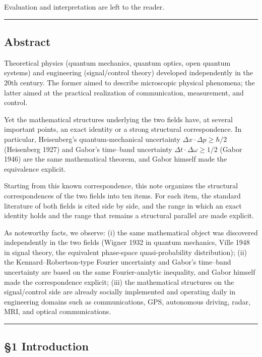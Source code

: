 \documentclass[
]{article}
\begin{document}
Evaluation and interpretation are left to the reader.

\begin{center}\rule{0.5\linewidth}{0.5pt}\end{center}

\subsection{Abstract}\label{abstract}

Theoretical physics (quantum mechanics, quantum optics, open quantum
systems) and engineering (signal/control theory) developed independently
in the 20th century. The former aimed to describe microscopic physical
phenomena; the latter aimed at the practical realization of
communication, measurement, and control.

Yet the mathematical structures underlying the two fields have, at
several important points, an exact identity or a strong structural
correspondence. In particular, Heisenberg's quantum-mechanical
uncertainty \(\Delta x \cdot \Delta p \geq \hbar/2\) (Heisenberg 1927)
and Gabor's time--band uncertainty
\(\Delta t \cdot \Delta \omega \geq 1/2\) (Gabor 1946) are the same
mathematical theorem, and Gabor himself made the equivalence explicit.

Starting from this known correspondence, this note organizes the
structural correspondences of the two fields into ten items. For each
item, the standard literature of both fields is cited side by side, and
the range in which an exact identity holds and the range that remains a
structural parallel are made explicit.

As noteworthy facts, we observe: (i) the same mathematical object was
discovered independently in the two fields (Wigner 1932 in quantum
mechanics, Ville 1948 in signal theory, the equivalent phase-space
quasi-probability distribution); (ii) the Kennard--Robertson-type
Fourier uncertainty and Gabor's time--band uncertainty are based on the
same Fourier-analytic inequality, and Gabor himself made the
correspondence explicit; (iii) the mathematical structures on the
signal/control side are already socially implemented and operating daily
in engineering domains such as communications, GPS, autonomous driving,
radar, MRI, and optical communications.

\begin{center}\rule{0.5\linewidth}{0.5pt}\end{center}

\subsection{§1 Introduction}\label{introduction}
\end{document}
